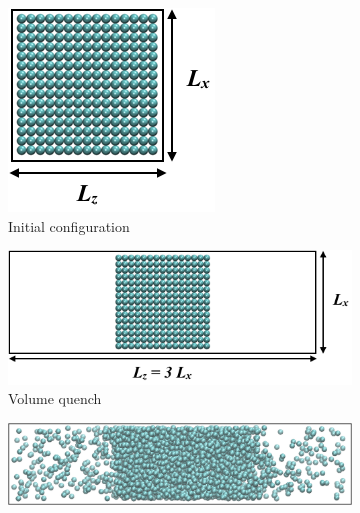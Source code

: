 \documentclass[9pt,bestpractices]{livecoms}
\begin{document}
\begin{figure}
\centering
	\begin{subfigure}{0.12\textwidth} %
    \includegraphics[width=\textwidth]{gfx/image16.png}
		\caption{Initial configuration} %
	\end{subfigure}
	\begin{subfigure}{0.28\textwidth} %
    \includegraphics[width=\textwidth]{gfx/image17.png}
    \caption{Volume quench}
	\end{subfigure}
	\begin{subfigure}{0.4\textwidth} %
    \includegraphics[width=\textwidth]{gfx/image18.png}

\end{subfigure}
\end{figure}
\end{document}
